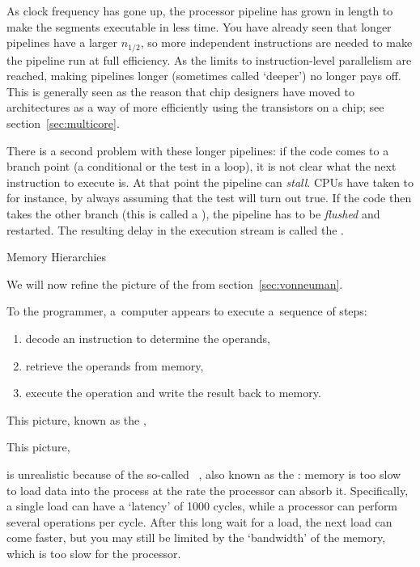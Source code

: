 As clock frequency has gone up, the processor pipeline has grown in
length to make the segments executable in less time. You have already
seen that longer pipelines have a larger $n_{1/2}$, so more
independent instructions are needed to make the pipeline run at full
efficiency. As the limits to instruction-level parallelism are
reached, making pipelines longer (sometimes
called `deeper') no longer pays off. This is
generally seen as the reason that chip designers have moved to
 architectures as a way of more efficiently
using the transistors on a chip;
see section~\ref{sec:multicore}.

There is a second problem with these longer pipelines: if the code
comes to a branch point (a conditional or the test in a loop), it is
not clear what the next instruction to execute is. At that point the
pipeline can \emph{stall}. \acp{CPU} have taken to
 for instance, by always assuming
that the test will turn out true. If the code then takes the other
branch (this is called a ), the
pipeline has to be \emph{flushed} and
restarted. The resulting delay in the execution stream is called the
.

 {Memory Hierarchies}
\label{sec:hierarchy}

We will now refine the picture of the 
from section~\ref{sec:vonneuman}.

To the programmer, a~computer appears to execute a~sequence of steps:
\begin{enumerate}
\item decode an instruction to determine the operands,
\item retrieve the operands from memory,
\item execute the operation and write the result back to memory.
\end{enumerate}
\begin{nopackt}
This picture,
known as  the ,
\end{nopackt}
\begin{packt}
This picture, 
\end{packt}
is unrealistic because of the
so-called ~\cite{Wulf:memory-wall},
also known as the :
memory is too slow to load data into the process at the rate the
processor can absorb it.
Specifically, a single load can have a `latency' of 1000 cycles,
while a processor can perform several operations per cycle.
After this long wait for a load, the next load can come faster,
but you may still be limited by the `bandwidth' of the memory,
which is too slow for the processor.

